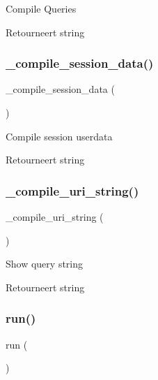 Compile Queries

\begin{DoxyReturn}{Retourneert}
string 
\end{DoxyReturn}
\mbox{\label{class_c_i___profiler_a65f7d92ff03632e35cd506dd500a2dd7}} 
\subsubsection{\texorpdfstring{\_compile\_session\_data()}{\_compile\_session\_data()}}
{\footnotesize\ttfamily \+\_\+compile\+\_\+session\+\_\+data (\begin{DoxyParamCaption}{ }\end{DoxyParamCaption})\hspace{0.3cm}{\ttfamily [protected]}}

Compile session userdata

\begin{DoxyReturn}{Retourneert}
string 
\end{DoxyReturn}
\mbox{\label{class_c_i___profiler_a781803c49bf0c92d47187c76ebb42a1b}} 
\subsubsection{\texorpdfstring{\_compile\_uri\_string()}{\_compile\_uri\_string()}}
{\footnotesize\ttfamily \+\_\+compile\+\_\+uri\+\_\+string (\begin{DoxyParamCaption}{ }\end{DoxyParamCaption})\hspace{0.3cm}{\ttfamily [protected]}}

Show query string

\begin{DoxyReturn}{Retourneert}
string 
\end{DoxyReturn}
\mbox{\label{class_c_i___profiler_afb0fafe7e02a3ae1993c01c19fad2bae}} 
\subsubsection{\texorpdfstring{run()}{run()}}
{\footnotesize\ttfamily run (\begin{DoxyParamCaption}{ }\end{DoxyParamCaption})}

